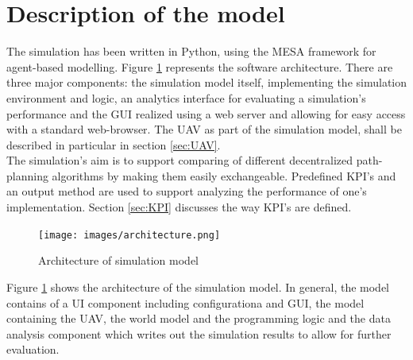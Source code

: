 \section{Description of the model}\label{sec:model}
The simulation has been written in Python, using the MESA \cite{masad.2015} framework for agent-based modelling. Figure \ref{fig:architecture} represents the software architecture. There are three major components: the simulation model itself, implementing the simulation environment and logic, an analytics interface for evaluating a simulation's performance and the GUI realized using a web server and allowing for easy access with a standard web-browser. The UAV as part of the simulation model, shall be described in particular in section \ref{sec:UAV}.\\
The simulation's aim is to support comparing of different decentralized path-planning algorithms by making them easily exchangeable. Predefined KPI's and an output method are used to support analyzing the performance of one's implementation. Section \ref{sec:KPI} discusses the way KPI's are defined.\\
\begin{figure}[htbp]\label{fig:architecture}
	\centering
	\texttt{[image: images/architecture.png]} 
	\caption{Architecture of simulation model}
\end{figure}
Figure \ref{fig:architecture} shows the architecture of the simulation model. In general, the model contains of a UI component including configurationa and GUI, the model containing the UAV, the world model and the programming logic and the data analysis component which writes out the simulation results to allow for further evaluation. 


